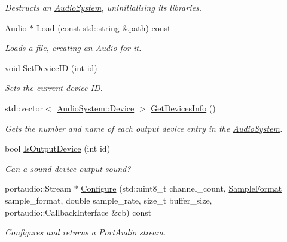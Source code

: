 \begin{DoxyCompactItemize}
\begin{DoxyCompactList}\small\item\em Destructs an \hyperlink{classAudioSystem}{Audio\+System}, uninitialising its libraries. \end{DoxyCompactList}\item 
\hyperlink{classAudio}{Audio} $\ast$ \hyperlink{classAudioSystem_a2172608177d2bd54377bfc3c61cd117d}{Load} (const std\+::string \&path) const 
\begin{DoxyCompactList}\small\item\em Loads a file, creating an \hyperlink{classAudio}{Audio} for it. \end{DoxyCompactList}\item 
void \hyperlink{classAudioSystem_ade3b400828991d02e36a0b61302d30d2}{Set\+Device\+I\+D} (int id)
\begin{DoxyCompactList}\small\item\em Sets the current device I\+D. \end{DoxyCompactList}\item 
std\+::vector$<$ \hyperlink{classAudioSystem_a33bfa767bca10a6ce71e72708c586c67}{Audio\+System\+::\+Device} $>$ \hyperlink{classAudioSystem_aa268faeb9243c18588631024958856e6}{Get\+Devices\+Info} ()
\begin{DoxyCompactList}\small\item\em Gets the number and name of each output device entry in the \hyperlink{classAudioSystem}{Audio\+System}. \end{DoxyCompactList}\item 
bool \hyperlink{classAudioSystem_a001cd82f854883b80b3ed7d35795581b}{Is\+Output\+Device} (int id)
\begin{DoxyCompactList}\small\item\em Can a sound device output sound? \end{DoxyCompactList}\item 
portaudio\+::\+Stream $\ast$ \hyperlink{classAudioSystem_a78e8754440e0a29f5fac9ca1cd79a109}{Configure} (std\+::uint8\+\_\+t channel\+\_\+count, \hyperlink{sample__formats_8hpp_a21cca244e782ff3acc8805fb73236772}{Sample\+Format} sample\+\_\+format, double sample\+\_\+rate, size\+\_\+t buffer\+\_\+size, portaudio\+::\+Callback\+Interface \&cb) const 
\begin{DoxyCompactList}\small\item\em Configures and returns a Port\+Audio stream. \end{DoxyCompactList}\end{DoxyCompactItemize}
